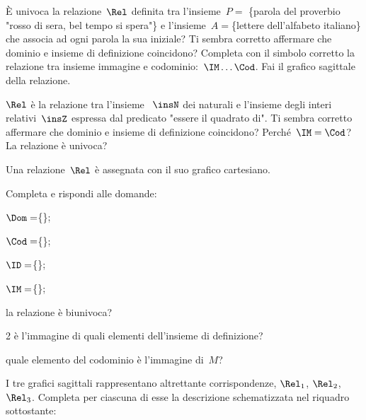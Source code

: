 \begin{multicols}{2}
\begin{esercizio}
\label{ese:7.47}
È univoca la relazione~$\Rel$ definita tra l'insieme~$P=$ \{parola del proverbio "rosso di sera, bel tempo si spera"\} e l'insieme~$A=$\{lettere dell'alfabeto italiano\}
che associa ad ogni parola la sua iniziale? Ti sembra corretto affermare che dominio e insieme di definizione coincidono? Completa con il simbolo corretto
la relazione tra insieme immagine e codominio:~$\IM\ldots\Cod$. Fai il grafico sagittale della relazione.
\end{esercizio}
\end{multicols}

\begin{esercizio}
\label{ese:7.48}
$\Rel$ è la relazione tra l'insieme ~$\insN$ dei naturali e l'insieme degli interi relativi~$\insZ$ espressa dal predicato "essere il quadrato di". Ti sembra corretto affermare che
dominio e insieme di definizione coincidono? Perché~$\IM=\Cod$? La relazione è univoca?
\end{esercizio}
\begin{esercizio}
\label{ese:7.49}
Una relazione~$\Rel$ è assegnata con il suo grafico cartesiano.
\begin{center}
 
\end{center}
Completa e rispondi alle domande:

\begin{enumeratea}
\item $\Dom=$\{\dotfill\};
\item $\Cod=$\{\dotfill\};
\item $\ID=$\{\dotfill\};
\item $\IM=$\{\dotfill\};
\item la relazione è biunivoca?
\item 2 è l'immagine di quali elementi dell'insieme di definizione?
\item quale elemento del codominio è l'immagine di~$M$?
\end{enumeratea}
\end{esercizio}

\begin{esercizio}
\label{ese:7.50}
I tre grafici sagittali rappresentano altrettante corrispondenze, $\Rel_1$, $\Rel_2$, $\Rel_3$.
Completa per ciascuna di esse la descrizione schematizzata nel riquadro sottostante:
\begin{center}
 
\end{center}
\end{esercizio}

